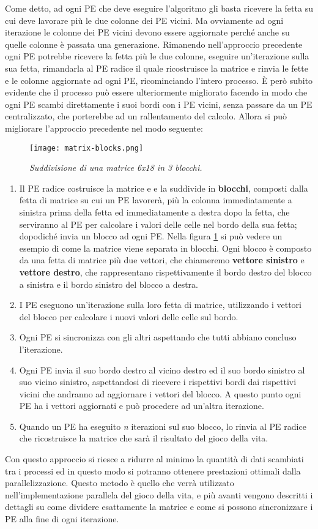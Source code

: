 Come detto, ad ogni PE che deve eseguire l'algoritmo gli basta ricevere la fetta su cui deve lavorare pi\`u le due colonne dei PE vicini. Ma ovviamente ad ogni iterazione le colonne dei PE vicini devono essere aggiornate perch\'e anche su quelle colonne \`e passata una generazione. Rimanendo nell'approccio precedente ogni PE potrebbe ricevere la fetta pi\`u le due colonne, eseguire un'iterazione sulla sua fetta, rimandarla al PE radice il quale ricostruisce la matrice e rinvia le fette e le colonne aggiornate ad ogni PE, ricominciando l'intero processo. \`E per\`o subito evidente che il processo pu\`o essere ulteriormente migliorato facendo in modo che ogni PE scambi direttamente i suoi bordi con i PE vicini, senza passare da un PE centralizzato, che porterebbe ad un rallentamento del calcolo. Allora si pu\`o migliorare l'approccio precedente nel modo seguente:
\begin{figure}[ht]
  \centering
  \texttt{[image: matrix-blocks.png]}
  \caption{\emph{Suddivisione di una matrice 6x18 in 3 blocchi.}}
  \label{fig:matrix_blocks}
\end{figure}
\begin{enumerate}
  \item Il PE radice costruisce la matrice e e la suddivide in \textbf{blocchi}, composti dalla fetta di matrice su cui un PE lavorer\`a, pi\`u la colonna immediatamente a sinistra prima della fetta ed immediatamente a destra dopo la fetta, che serviranno al PE per calcolare i valori delle celle nel bordo della sua fetta; dopodich\'e invia un blocco ad ogni PE. Nella figura \ref{fig:matrix_blocks} si pu\`o vedere un esempio di come la matrice viene separata in blocchi. Ogni blocco \`e composto da una fetta di matrice pi\`u due vettori, che chiameremo \textbf{vettore sinistro} e \textbf{vettore destro}, che rappresentano rispettivamente il bordo destro del blocco a sinistra e il bordo sinistro del blocco a destra.
  \item I PE eseguono un'iterazione sulla loro fetta di matrice, utilizzando i vettori del blocco per calcolare i nuovi valori delle celle sul bordo.
  \item Ogni PE si sincronizza con gli altri aspettando che tutti abbiano concluso l'iterazione.
  \item Ogni PE invia il suo bordo destro al vicino destro ed il suo bordo sinistro al suo vicino sinistro, aspettandosi di ricevere i rispettivi bordi dai rispettivi vicini che andranno ad aggiornare i vettori del blocco. A questo punto ogni PE ha i vettori aggiornati e pu\`o procedere ad un'altra iterazione.
  \item Quando un PE ha eseguito \textit{n} iterazioni sul suo blocco, lo rinvia al PE radice che ricostruisce la matrice che sar\`a il risultato del gioco della vita.
\end{enumerate}
Con questo approccio si riesce a ridurre al minimo la quantit\`a di dati scambiati tra i processi ed in questo modo si potranno ottenere prestazioni ottimali dalla parallelizzazione. Questo metodo \`e quello che verr\`a utilizzato nell'implementazione parallela del gioco della vita, e pi\`u avanti vengono descritti i dettagli su come dividere esattamente la matrice e come si possono sincronizzare i PE alla fine di ogni iterazione.

